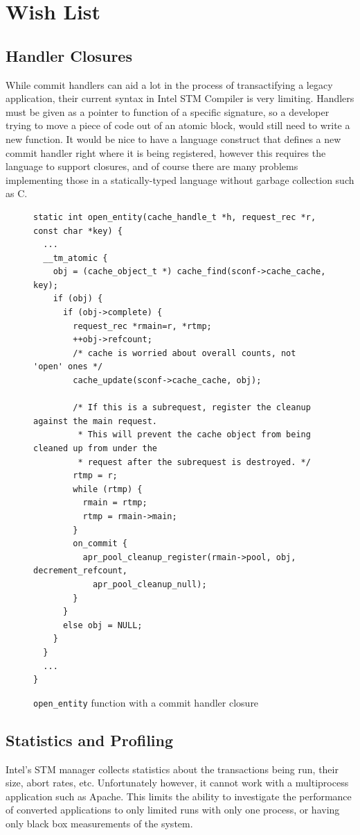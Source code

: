 \documentclass[preprint,natbib,11pt]{sigplanconf}
\begin{document}
\section{Wish List}\label{sec:wishlist}
\subsection{Handler Closures}
While commit handlers can aid a lot in the process of transactifying a legacy
application, their current syntax in Intel STM Compiler is very limiting.
Handlers must be given as a pointer to function of a specific signature, so a
developer trying to move a piece of code out of an atomic block, would still
need to write a new function. It would be nice to have a language construct that
defines a new commit handler right where it is being registered, however this
requires the language to support closures, and of course there are many problems
implementing those in a statically-typed language without garbage collection
such as C.

\begin{figure}
\begin{lstlisting}
static int open_entity(cache_handle_t *h, request_rec *r, const char *key) {
  ...
  __tm_atomic {
    obj = (cache_object_t *) cache_find(sconf->cache_cache, key);
    if (obj) {
      if (obj->complete) {
        request_rec *rmain=r, *rtmp;
        ++obj->refcount;
        /* cache is worried about overall counts, not 'open' ones */
        cache_update(sconf->cache_cache, obj);

        /* If this is a subrequest, register the cleanup against the main request.
         * This will prevent the cache object from being cleaned up from under the
         * request after the subrequest is destroyed. */
        rtmp = r;
        while (rtmp) {
          rmain = rtmp;
          rtmp = rmain->main;
        }
        on_commit {
          apr_pool_cleanup_register(rmain->pool, obj, decrement_refcount, 
            apr_pool_cleanup_null);
        }
      }
      else obj = NULL;
    }
  }
  ...
}
\end{lstlisting}
\caption{{\tt open\_entity} function with a commit handler closure}
\label{code:closure-open-entity}
\end{figure}

\subsection{Statistics and Profiling}\label{sec:wishlist-statistics}
Intel's STM manager collects statistics about the transactions being run, their
size, abort rates, etc. Unfortunately however, it cannot work with a
multiprocess application such as Apache. This limits the ability to investigate
the performance of converted applications to only limited runs with only one
process, or having only black box measurements of the system.
\end{document}
